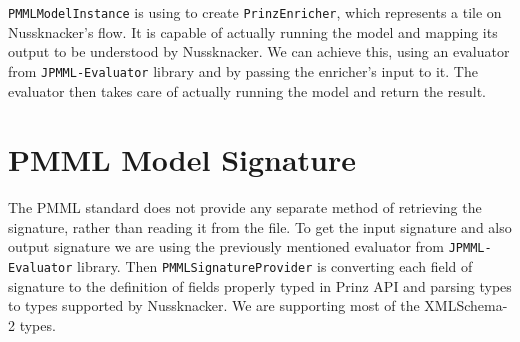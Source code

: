\texttt{PMMLModelInstance} is using to create \texttt{PrinzEnricher}, which represents a tile on Nussknacker’s flow.
It is capable of actually running the model and mapping its output to be understood by Nussknacker.
We can achieve this, using an evaluator from \texttt{JPMML-Evaluator} library and by passing the enricher's input to it.
The evaluator then takes care of actually running the model and return the result.

\section{PMML Model Signature}

The PMML standard does not provide any separate method of retrieving the signature, rather than reading it from the file.
To get the input signature and also output signature we are using the previously mentioned evaluator from \texttt{JPMML-Evaluator} library.
Then \texttt{PMMLSignatureProvider} is converting each field of signature to the definition of fields properly typed in Prinz API
and parsing types to types supported by Nussknacker.
We are supporting most of the XMLSchema-2 types.
